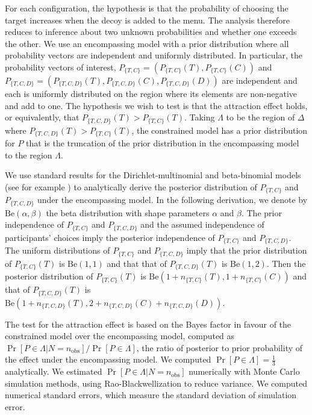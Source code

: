 \documentclass[11pt,letter]{article}
\begin{document}
For each configuration, the hypothesis is that the probability of choosing the target increases when the decoy is added to the menu.
The analysis therefore reduces to inference about two unknown probabilities and whether one exceeds the other.
We use an encompassing model with a prior distribution where all probability vectors are independent and uniformly distributed.
In particular, the probability vectors of interest, $P_{\{T,C\}} = (P_{\{T,C\}}(T), P_{\{T,C\}}(C))$ and $P_{\{T,C,D\}} = (P_{\{T,C,D\}}(T), P_{\{T,C,D\}}(C), P_{\{T,C,D\}}(D))$ are independent and each is uniformly distributed on the region where its elements are non-negative and add to one.
The hypothesis we wish to test is that the attraction effect holds, or equivalently, that $P_{\{T,C,D\}}(T) > P_{\{T,C\}}(T)$.
Taking $\Lambda$ to be the region of $\Delta$ where $P_{\{T,C,D\}}(T) > P_{\{T,C\}}(T)$, the constrained model has a prior distribution for $P$ that is the truncation of the prior distribution in the encompassing model to the region $\Lambda$.

We use standard results for the Dirichlet-multinomial and beta-binomial models (see for example \citet{gelman:95}) to analytically derive the posterior distribution of $P_{\{T,C\}}$ and $P_{\{T,C,D\}}$ under the encompassing model.
In the following derivation, we denote by $\mathrm{Be}(\alpha,\beta)$ the beta distribution with shape parameters $\alpha$ and $\beta$.
The prior independence of $P_{\{T,C\}}$ and $P_{\{T,C,D\}}$ and the assumed independence of participants' choices imply the posterior independence of $P_{\{T,C\}}$ and $P_{\{T,C,D\}}$.
The uniform distributions of $P_{\{T,C\}}$ and $P_{\{T,C,D\}}$ imply that the prior distribution of $P_{\{T,C\}}(T)$ is $\mathrm{Be}(1,1)$ and that that of $P_{\{T,C,D\}}(T)$ is $\mathrm{Be}(1,2)$.
Then the posterior distribution of $P_{\{T,C\}}(T)$ is $\mathrm{Be}(1 + n_{\{T,C\}}(T), 1 + n_{\{T,C\}}(C))$ and that of $P_{\{T,C,D\}}(T)$ is $\mathrm{Be}(1 + n_{\{T,C,D\}}(T), 2 + n_{\{T,C,D\}}(C) + n_{\{T,C,D\}}(D))$.

The test for the attraction effect is based on the Bayes factor in favour of the constrained model over the encompassing model, computed as  $\Pr[P \in \Lambda|N = n_{\mathrm{obs}}]/\Pr[P \in \Lambda]$, the ratio of posterior to prior probability of the effect under the encompassing model.
We computed $\Pr[P \in \Lambda] = \tfrac{1}{3}$ analytically.
We estimated $\Pr[P \in \Lambda|N = n_{\mathrm{obs}}]$ numerically with Monte Carlo simulation methods, using Rao-Blackwellization to reduce variance.
We computed numerical standard errors, which measure the standard deviation of simulation error.
\end{document}

